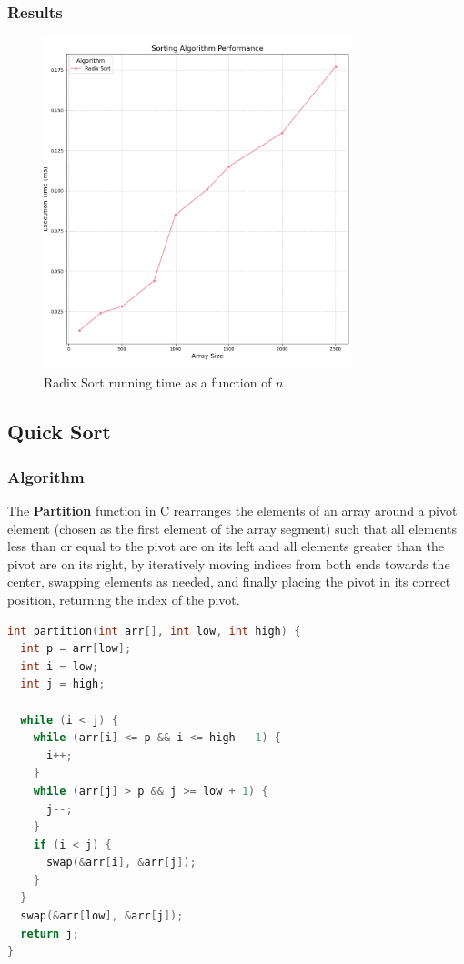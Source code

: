 \documentclass{article}
\begin{document}
\subsubsection{Results}
\begin{figure}[H]
	\includegraphics[width=0.8\textwidth]{images/radix_sort.png}
	\caption{Radix Sort running time as a function of $n$}
\end{figure}


\subsection{Quick Sort}

\subsubsection{Algorithm}
The \textbf{Partition} function in C rearranges the elements of an array around a pivot element (chosen as the first element of the array segment) such that all elements less than or equal to the pivot are on its left and all elements greater than the pivot are on its right, by iteratively moving indices from both ends towards the center, swapping elements as needed, and finally placing the pivot in its correct position, returning the index of the pivot.

\begin{lstlisting}[language=C, caption=Partition implementation]
int partition(int arr[], int low, int high) {
  int p = arr[low];
  int i = low;
  int j = high;

  while (i < j) {
    while (arr[i] <= p && i <= high - 1) {
      i++;
    }
    while (arr[j] > p && j >= low + 1) {
      j--;
    }
    if (i < j) {
      swap(&arr[i], &arr[j]);
    }
  }
  swap(&arr[low], &arr[j]);
  return j;
}
\end{lstlisting}
\end{document}
